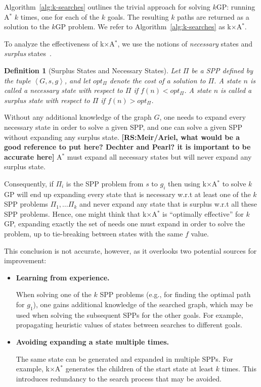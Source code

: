 \documentclass{aicom2e}
\newtheorem{definition}{Definition}
\newcommand{\kgs}{$k$GP}
\newcommand{\astar}{A$^*$}
\newcommand{\kxastar}{k$\times$A$^*$}
\newcommand{\tuple}[1]{\ensuremath{\left \langle #1 \right \rangle }}
\newcommand{\roni}[1]{\textbf{[RS:#1]}}
\begin{document}
Algorithm~\ref{alg:k-searches} outlines the trivial approach for solving
\kgs{}: running \astar{} $k$ times, one for each of the $k$ goals. The
resulting $k$ paths are returned as a solution to the \kgs{} problem. We refer
to Algorithm~\ref{alg:k-searches} as \kxastar{}.


To analyze the effectiveness of \kxastar{}, we use the notions of {\em necessary} states and {\em surplus} states~\cite{goldenberg2014enhanced}.

\begin{definition}[Surplus States and Necessary States]
    Let $\Pi$ be a SPP defined by the tuple $\tuple{G,s,g}$, and let $opt_\Pi$ denote the cost of a solution to $\Pi$.
    A state $n$ is called a {\em necessary} state with respect to $\Pi$ if $f(n)<opt_\Pi$.
    A state $n$ is called a {\em surplus} state with respect to $\Pi$ if $f(n)>opt_\Pi$.
\label{def:surplus}
\end{definition}
Without any additional knowledge of the graph $G$, one needs to expand every necessary state in order to solve a given SPP,
and one can solve a given SPP without expanding any surplus state. \roni{Meir/Ariel, what would be a good reference to put here? Dechter and Pearl? it is important to be accurate here}
\astar{} must expand all necessary states but will never expand any surplus state.

Consequently, if $\Pi_i$ is the SPP problem from $s$ to $g_i$
then using \kxastar{} to solve \kgs{} will end up expanding every state that is necessary w.r.t at least one of the $k$ SPP problems $\Pi_1,\ldots \Pi_k$ and never expand any state that is surplus w.r.t all these SPP problems.
Hence, one might think that \kxastar{} is ``optimally effective'' for \kgs{},
expanding exactly the set of needs one must expand in order to solve the problem, up to tie-breaking between states with the same $f$ value.


This conclusion is not accurate, however, as it overlooks two potential sources for improvement:
\begin{itemize}

\item {\bf Learning from experience.}

When solving one of the $k$ SPP problems (e.g., for finding the optimal path for $g_1$), 
one gains additional knowledge of the searched graph, which may be used when solving the subsequent
SPPs for the other goals. For example, propagating heuristic values of states between searches to different goals.

\item {\bf Avoiding expanding a state multiple times.}

The same state can be generated and expanded in multiple SPPs. For example, \kxastar{} 
generates the children of the start state at least $k$ times. 
This introduces redundancy to the search process that may be avoided.
\end{itemize}
\end{document}
